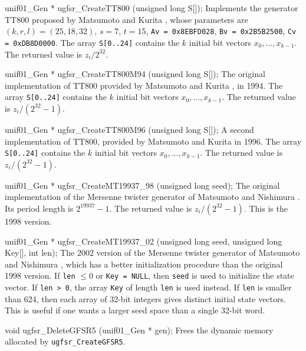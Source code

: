 unif01_Gen * ugfsr_CreateTT800 (unsigned long S[]);
\endcode
  \tab Implements the generator TT800  proposed by
%
   Matsumoto and Kurita \cite{rMAT94a},  whose parameters are
   $(k,r,l) = (25,18,32)$, $s = 7$, $t = 15$,
   {\tt Av = 0x8EBFD028}, {\tt Bv = 0x2B5B2500}, {\tt Cv = 0xDB8D0000}.
   The array {\tt S[0..24]} contains the $k$ initial bit vectors
   $x_0, \dots, x_{k-1}$.   The returned value is $z_i/2^{32}$.
  \endtab
\code


unif01_Gen * ugfsr_CreateTT800M94 (unsigned long S[]);
\endcode
  \tab  The original implementation of TT800 provided by
  Matsumoto and Kurita \cite{rMAT94a}, in 1994.
   The array {\tt S[0..24]} contains the $k$ initial bit vectors
   $x_0, \dots, x_{k-1}$.  The returned value is  $z_i/(2^{32} - 1)$.
  \endtab
\code


unif01_Gen * ugfsr_CreateTT800M96 (unsigned long S[]);
\endcode
  \tab A second implementation of TT800, provided by Matsumoto
  and Kurita in 1996.
   The array {\tt S[0..24]} contains the $k$ initial bit vectors
   $x_0, \dots, x_{k-1}$. The returned value is  $z_i/(2^{32} - 1)$.
  \endtab
\code


unif01_Gen * ugfsr_CreateMT19937_98 (unsigned long seed);
\endcode
  \tab The original implementation of the Mersenne twister generator
%
  of Matsumoto and Nishimura \cite{rMAT98a}.
  Its period length is $2^{19937}-1$.
  The returned value is $z_i/(2^{32} - 1)$. This is the 1998 version.
  \endtab
\code


unif01_Gen * ugfsr_CreateMT19937_02 (unsigned long seed,
                                     unsigned long Key[], int len);
\endcode
  \tab The 2002 version of the Mersenne twister generator \label{rng:MT19937}
  of Matsumoto and Nishimura \cite{rMAT98a},  which has a better
  initialization  procedure than the  original 1998 version.
  If {\tt len} $ \le 0$ or {\tt Key = NULL}, then  {\tt seed} is used to
  initialize the state vector. If  {\tt len > 0}, the array {\tt Key} of
   length  {\tt len} is used instead.
   If  {\tt len} is smaller than 624,
   then each array of 32-bit integers gives distinct initial
   state vectors. This is useful if one  wants a larger seed space
   than a single 32-bit word.
  \endtab




\code

void ugfsr_DeleteGFSR5 (unif01_Gen * gen);
\endcode
  \tab Frees the dynamic memory allocated by
   {\tt ugfsr\_CreateGFSR5}.
 \endtab
\code


